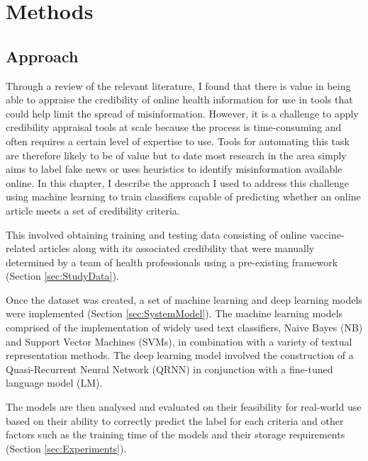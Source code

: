 \documentclass[a4paper,twoside,phd]{BYUPhys}
\begin{document}
\chapter{Methods}
\label{chap:Methods}

\section{Approach}
\label{sec:Approach}

Through a review of the relevant literature, I found that there is value in being able to appraise the credibility of online health information for use in tools that could help limit the spread of misinformation. However, it is a challenge to apply credibility appraisal tools at scale because the process is time-consuming and often requires a certain level of expertise to use. Tools for automating this task are therefore likely to be of value but to date most research in the area simply aims to label fake news or uses heuristics to identify misinformation available online. In this chapter, I describe the approach I used to address this challenge using machine learning to train classifiers capable of predicting whether an online article meets a set of credibility criteria.\newline

This involved obtaining training and testing data consisting of online vaccine-related articles along with its associated credibility that were manually determined by a team of health professionals using a pre-existing framework (Section \ref{sec:StudyData}). \newline

Once the dataset was created, a set of machine learning and deep learning models were implemented (Section \ref{sec:SystemModel}). The machine learning models comprised of the implementation of widely used text classifiers, Naive Bayes (NB) and Support Vector Machines (SVMs), in combination with a variety of textual representation methods. The deep learning model involved the construction of a Quasi-Recurrent Neural Network (QRNN) in conjunction with a fine-tuned language model (LM). \newline

The models are then analysed and evaluated on their feasibility for real-world use based on their ability to correctly predict the label for each criteria and other factors such as the training time of the models and their storage requirements (Section \ref{sec:Experiments}).
\end{document}
